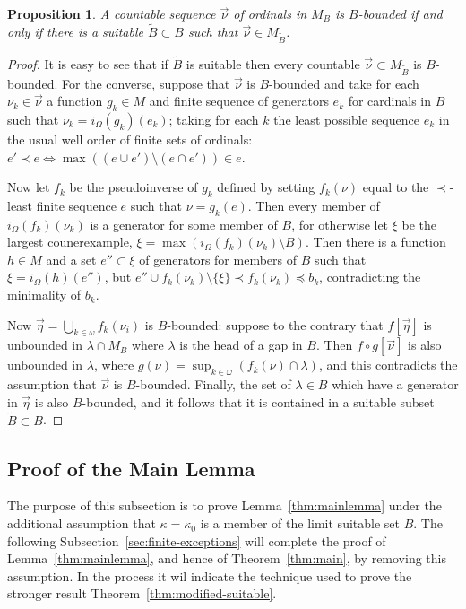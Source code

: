 \documentclass[
twoside,
]{article}
\newtheorem{proposition}[theorem]{Proposition}
\theoremstyle{definition}
\theoremstyle{remark}
\newcommand{\LS}{limit suitable}
\newcommand{\ords}{\Omega}
\newcommand{\sing}[1]{\{#1\}}
\begin{document}
\begin{proposition}
  \label{thm:limitSuitableC_Bdefinable}
  A countable sequence $\vec\nu$ of ordinals in $M_B$ is $B$-bounded
  if and only  if there is a suitable $\tilde B\subset B$ such that
  $\vec\nu\in M_{\tilde B}$.
\end{proposition}
\begin{proof}
  It is easy to see that if $\tilde B$ is suitable then every
  countable  $\vec\nu\subset M_{\tilde B}$ is $B$-bounded.    For the
  converse, suppose that $\vec\nu$ is $B$-bounded and take for
  each $\nu_k\in \vec\nu$ a function $g_k\in M$ and finite sequence of
  generators $e_k$ for cardinals in $B$ such that
  $\nu_k=i_{\ords}(g_k)(e_k)$; taking for each $k$ the least possible
  sequence $e_k$ in the 
  usual well order of finite sets of  ordinals: 
  $e'\prec e\iff\max((e\cup e')\setminus (e\cap e'))\in e$.   
  
  Now let $f_k$ be the pseudoinverse of $g_k$ defined by setting
  $f_k(\nu)$ equal to 
  the $\prec$-least finite sequence $e$ such that $\nu=g_k(e)$.
  Then every member of $i_{\ords}(f_k)(\nu_k)$ is a generator for some
  member of $B$, for otherwise let $\xi$ be the largest counerexample, 
  $\xi=\max(i_{\ords}(f_k)(\nu_k)\setminus B)$.  Then there is a
  function $h\in M$ 
  and a set $e''\subset\xi$ of generators for members of $B$ such
  that 
  $\xi=i_{\ords}(h)(e'')$, but
  $e''\cup  f_{k}(\nu_k)\setminus\sing{\xi}\prec f_k(\nu_k)\preceq
  b_k$,   contradicting the minimality of $b_k$.
  
  Now $\vec \eta=\bigcup_{k\in\omega}f_{k}(\nu_i)$ is $B$-bounded: suppose to
  the contrary that $f[\vec\eta]$ is unbounded in $\lambda\cap M_B$ where
  $\lambda$ is the head of a gap  in $B$. Then $f\circ g[ \vec\nu]$ is
  also unbounded in $\lambda$, where
  $g(\nu)=\sup_{k\in\omega}(f_k(\nu)\cap\lambda)$, and this contradicts
  the assumption that $\vec\nu$ is $B$-bounded.   Finally, the set of
  $\lambda\in B$ which have a generator in $\vec\eta$ is also
  $B$-bounded, and it follows that it is contained in a suitable
  subset $\tilde B\subset B$.  
\end{proof}


\subsection{Proof of the Main Lemma}
\label{sec:proof-main-lemma}

The purpose of this subsection is to prove 
Lemma~\ref{thm:mainlemma} under the  additional assumption that
$\kappa=\kappa_0$ is a member of the \LS{} set $B$.   The following
Subsection~\ref{sec:finite-exceptions} will  complete the proof of
Lemma~\ref{thm:mainlemma}, and hence of 
Theorem~\ref{thm:main}, by removing this
assumption.   
In the process it wil indicate the technique used to prove the
stronger result Theorem~\ref{thm:modified-suitable}.
\end{document}
